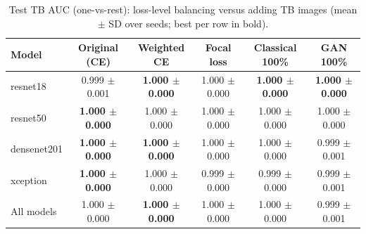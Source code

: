 \begin{table}[htbp]
\centering
\caption{Test TB AUC (one-vs-rest): loss-level balancing versus adding TB images (mean $\pm$ SD over seeds; best per row in bold).}
\label{tab:loss_tb_auc}
\begin{tabular}{lccccc}
\toprule
Model & Original (CE) & Weighted CE & Focal loss & Classical 100\% & GAN 100\% \\
\midrule
resnet18 & 0.999 $\pm$ 0.001 & \textbf{1.000 $\pm$ 0.000} & 1.000 $\pm$ 0.000 & \textbf{1.000 $\pm$ 0.000} & \textbf{1.000 $\pm$ 0.000} \\
resnet50 & \textbf{1.000 $\pm$ 0.000} & 1.000 $\pm$ 0.000 & 1.000 $\pm$ 0.000 & 1.000 $\pm$ 0.000 & 1.000 $\pm$ 0.000 \\
densenet201 & \textbf{1.000 $\pm$ 0.000} & \textbf{1.000 $\pm$ 0.000} & 1.000 $\pm$ 0.000 & 1.000 $\pm$ 0.000 & 0.999 $\pm$ 0.001 \\
xception & \textbf{1.000 $\pm$ 0.000} & 1.000 $\pm$ 0.000 & 0.999 $\pm$ 0.000 & 0.999 $\pm$ 0.000 & 0.999 $\pm$ 0.001 \\
\midrule
All models & 1.000 $\pm$ 0.000 & \textbf{1.000 $\pm$ 0.000} & 1.000 $\pm$ 0.000 & 1.000 $\pm$ 0.000 & 0.999 $\pm$ 0.001 \\
\bottomrule
\end{tabular}
\end{table}